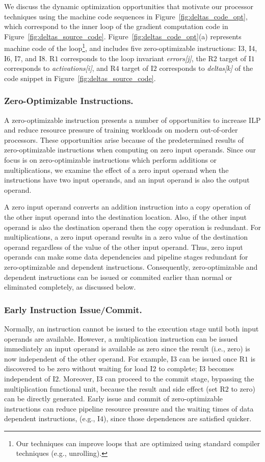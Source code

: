We discuss the dynamic optimization opportunities that motivate our processor techniques using the machine code sequences in Figure~\ref{fig:deltas_code_opt}, which correspond to the inner loop of the gradient computation code in Figure~\ref{fig:deltas_source_code}.    Figure~\ref{fig:deltas_code_opt}(a) represents machine code of the loop\footnote{Our techniques can improve loops that are optimized using standard compiler techniques (e.g., unrolling).}, and includes five zero-optimizable instructions: I$3$, I$4$, I$6$, I$7$, and I$8$.  
R$1$ corresponds to the loop invariant \emph{errors[j]}, the R$2$ target of I$1$ corresponds to \emph{activations[i]}, and R$4$ target of I$2$ corresponds to \emph{deltas[k]} of the code snippet in Figure~\ref{fig:deltas_source_code}.

\subsubsection{Zero-Optimizable Instructions.} A zero-optimizable instruction presents a number of opportunities to increase ILP and reduce resource pressure of training workloads on modern out-of-order processors.  These opportunities arise because of the predetermined results of zero-optimizable instructions when computing on zero input operands.  Since our focus is on zero-optimizable instructions which perform additions or multiplications, we examine the effect of a zero input operand when the instructions have two input operands, and an input operand is also the output operand. 

A zero input operand converts an addition instruction into a copy operation of the other input operand into the destination location. Also, if the other input operand is also the destination operand then the copy operation is redundant.  For multiplications, a zero input operand results in a zero value of the destination operand regardless of the value of the other input operand.  Thus, zero input operands can make some data dependencies and pipeline stages redundant for zero-optimizable and dependent instructions.  Consequently, zero-optimizable and dependent instructions can be issued or commited earlier than normal or eliminated completely, as discussed below. 

\subsubsection{Early Instruction Issue/Commit.}  Normally, an instruction cannot be issued to the execution stage until both input operands are available. However, a multiplication instruction can be issued immediately an input operand is available as zero since the result (i.e., zero) is now independent of the other operand.  For example, I$3$ can be issued once R$1$ is discovered to be zero without waiting for load I$2$ to complete; I$3$ becomes independent of I$2$.  Moreover, I$3$ can proceed to the commit stage, bypassing the multiplication functional unit, because the result and side effect (set R$2$ to zero)  can be directly generated.  Early issue and commit of zero-optimizable instructions can reduce pipeline resource pressure and the waiting times of data dependent instructions, (e.g., I$4$), since those dependences are satisfied quicker. 

